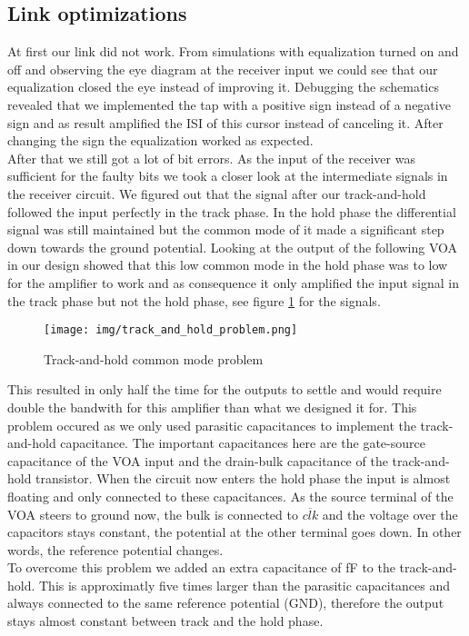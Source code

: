 \subsection{Link optimizations}
At first our link did not work. From simulations with equalization turned on and off and observing the eye diagram at the receiver input we could see that our equalization closed the eye instead of improving it. Debugging the schematics revealed that we implemented the tap with a positive sign instead of a negative sign and as result amplified the ISI of this cursor instead of canceling it. After changing the sign the equalization worked as expected.\\
After that we still got a lot of bit errors. As the input of the receiver was sufficient for the faulty bits we took a closer look at the intermediate signals in the receiver circuit. We figured out that the signal after our track-and-hold followed the input perfectly in the track phase. In the hold phase the differential signal was still maintained but the common mode of it made a significant step down towards the ground potential. Looking at the output of the following VOA in our design showed that this low common mode in the hold phase was to low for the amplifier to work and as consequence it only amplified the input signal in the track phase but not the hold phase, see figure \ref{fig:track_and_hold_problem} for the signals.

\begin{figure}[H]
  \centering
  {\texttt{[image: img/track\_and\_hold\_problem.png]}}
  \caption{Track-and-hold common mode problem}
  \label{fig:track_and_hold_problem}
\end{figure}

This resulted in only half the time for the outputs to settle and would require double the bandwith for this amplifier than what we designed it for. This problem occured as we only used parasitic capacitances to implement the track-and-hold capacitance. The important capacitances here are the gate-source capacitance of the VOA input and the drain-bulk capacitance of the track-and-hold transistor. When the circuit now enters the hold phase the input is almost floating and only connected to these capacitances. As the source terminal of the VOA steers to ground now, the bulk is connected to $\overline{clk}$ and the voltage over the capacitors stays constant, the potential at the other terminal goes down. In other words, the reference potential changes.\\
To overcome this problem we added an extra capacitance of \unit[20]{fF} to the track-and-hold. This is approximatly five times larger than the parasitic capacitances and always connected to the same reference potential (GND), therefore the output stays almost constant between track and the hold phase.
